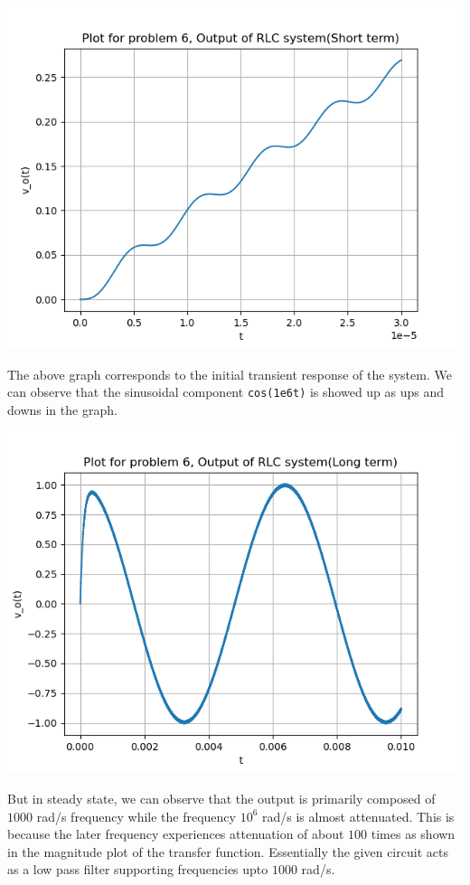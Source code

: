 \documentclass[12pt, a4paper]{report}
\begin{document}
\begin{center}
	\includegraphics[scale=0.8]{6a.png} 
	\label{fig:rawdata}
\end{center}
The above graph corresponds to the initial transient response of the system. We can observe that the sinusoidal component \texttt{cos(1e6t)} is showed up as ups and downs in the graph.  
\begin{center}
	\includegraphics[scale=0.8]{6b.png} 
	\label{fig:rawdata}
\end{center}
But in steady state, we can observe that the output is primarily composed of $1000$ rad/s frequency while the frequency $10^6$ rad/s is almost attenuated. This is because the later frequency experiences attenuation of about $100$ times as shown in the magnitude plot of the transfer function. Essentially the given circuit acts as a low pass filter supporting frequencies upto $1000$ rad/s. 
\end{document}
